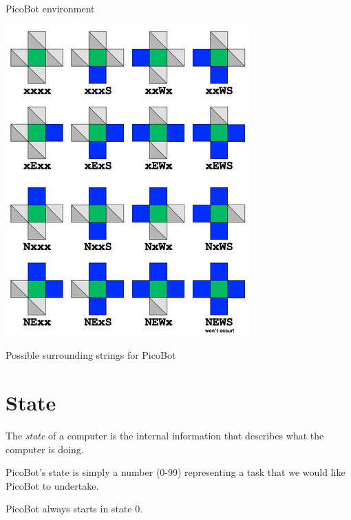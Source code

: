 \documentclass[8pt,a4paper,compress,handout]{beamer}
\begin{document}
\begin{frame}[fragile]
\begin{minipage}{100pt}
\begin{center}
\smallskip

\tiny PicoBot environment

\smallskip

\includegraphics[scale=0.25]{figures/picobot_surroundings.png}

\smallskip

\tiny Possible surrounding strings for PicoBot
\end{center}
\end{minipage}
\end{frame}

\section{State}
\begin{frame}[fragile]
The \emph{state} of a computer is the internal information that describes what the computer is doing.

\bigskip

PicoBot's state is simply a number (0-99) representing a task that we would like PicoBot to undertake.

\bigskip

PicoBot always starts in state 0.
\end{frame}
\end{document}
